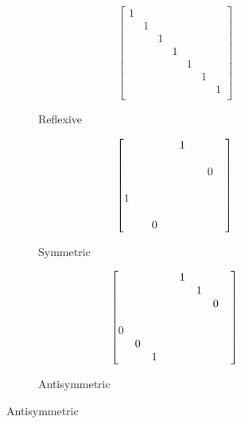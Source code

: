 \documentclass[article, 12pt]{article}
\theoremstyle{definition}
\begin{document}
    \begin{figure}[H]
        \centering
        \begin{subfigure}{.25\textwidth}
            \centering
            \[ \begin{bmatrix}
               1 & & & & & & \\
               & 1 & & & & & \\
               & & 1 & & & & \\
               & & & 1 & & & \\
               & & & & 1 & & \\
               & & & & & 1 & \\
               & & & & & & 1 \\
               \end{bmatrix} \] 
        \caption{Reflexive}
        \end{subfigure}
    \newcommand\tikznode[2]{\tikz[remember picture,baseline=(#1.base)]{\node(#1)[inner sep=0pt]{#2};}}
    \begin{subfigure}{.25\textwidth}
        \centering
        \[ \begin{bmatrix}
            \tikznode{d1}{} & & & & \tikznode{a}{1} &   \\
            & & & & & & &  \\
            & & & & & & \tikznode{c}{0} &   \\
            & & & & & & &  \\
            \tikznode{b}{1} & & & & & &   \\
            & & & & & & & \\
            & & \tikznode{d}{0} & & & & &  \tikznode{d2}{} \\
        \end{bmatrix} \]
        \caption{Symmetric}
    \end{subfigure}
    \begin{subfigure}{.25\textwidth}
        \centering
        \[ \begin{bmatrix}
            \tikznode{d1}{} & & & & \tikznode{a}{1} &   \\
             & & & & &\tikznode{e}{1} &   \\
            & & & & & & \tikznode{c}{0} &   \\
            & & & & & & &  \\
            \tikznode{b}{0} & & & & & &   \\
            & \tikznode{f}{0} & & & & &  \\
            & & \tikznode{d}{1} & & & & &  \tikznode{d2}{} \\
        \end{bmatrix} \]
        \caption{Antisymmetric}
    \end{subfigure}
    \end{figure}
\end{document}
